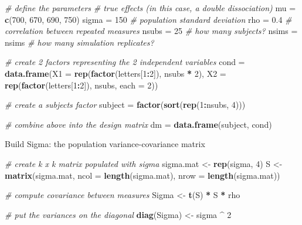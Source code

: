 \documentclass[
]{book}
\newenvironment{Shaded}{\begin{snugshade}}{\end{snugshade}}
\newcommand{\CommentTok}[1]{\textcolor[rgb]{0.56,0.35,0.01}{\textit{#1}}}
\newcommand{\DataTypeTok}[1]{\textcolor[rgb]{0.13,0.29,0.53}{#1}}
\newcommand{\DecValTok}[1]{\textcolor[rgb]{0.00,0.00,0.81}{#1}}
\newcommand{\FloatTok}[1]{\textcolor[rgb]{0.00,0.00,0.81}{#1}}
\newcommand{\KeywordTok}[1]{\textcolor[rgb]{0.13,0.29,0.53}{\textbf{#1}}}
\newcommand{\NormalTok}[1]{#1}
\newcommand{\OperatorTok}[1]{\textcolor[rgb]{0.81,0.36,0.00}{\textbf{#1}}}
\newcommand{\StringTok}[1]{\textcolor[rgb]{0.31,0.60,0.02}{#1}}
\begin{document}
\begin{Shaded}
\begin{Highlighting}[]
\CommentTok{# define the parameters}
\CommentTok{# true effects (in this case, a double dissociation)}
\NormalTok{mu =}\StringTok{ }\KeywordTok{c}\NormalTok{(}\DecValTok{700}\NormalTok{, }\DecValTok{670}\NormalTok{, }\DecValTok{690}\NormalTok{, }\DecValTok{750}\NormalTok{) }
\NormalTok{sigma =}\StringTok{ }\DecValTok{150}  \CommentTok{# population standard deviation}
\NormalTok{rho =}\StringTok{ }\FloatTok{0.4} \CommentTok{# correlation between repeated measures}
\NormalTok{nsubs =}\StringTok{ }\DecValTok{25} \CommentTok{# how many subjects?}
\NormalTok{nsims =}\StringTok{ }\NormalTok{nsims }\CommentTok{# how many simulation replicates?}
 
\CommentTok{# create 2 factors representing the 2 independent variables}
\NormalTok{cond =}\StringTok{ }\KeywordTok{data.frame}\NormalTok{(}\DataTypeTok{X1 =} \KeywordTok{rep}\NormalTok{(}\KeywordTok{factor}\NormalTok{(letters[}\DecValTok{1}\OperatorTok{:}\DecValTok{2}\NormalTok{]), nsubs }\OperatorTok{*}\StringTok{ }\DecValTok{2}\NormalTok{),}
\DataTypeTok{X2 =} \KeywordTok{rep}\NormalTok{(}\KeywordTok{factor}\NormalTok{(letters[}\DecValTok{1}\OperatorTok{:}\DecValTok{2}\NormalTok{]), nsubs, }\DataTypeTok{each =} \DecValTok{2}\NormalTok{))}
 
\CommentTok{# create a subjects factor}
\NormalTok{subject =}\StringTok{ }\KeywordTok{factor}\NormalTok{(}\KeywordTok{sort}\NormalTok{(}\KeywordTok{rep}\NormalTok{(}\DecValTok{1}\OperatorTok{:}\NormalTok{nsubs, }\DecValTok{4}\NormalTok{)))}
 
\CommentTok{# combine above into the design matrix}
\NormalTok{dm =}\StringTok{ }\KeywordTok{data.frame}\NormalTok{(subject, cond)}
\end{Highlighting}
\end{Shaded}

Build Sigma: the population variance-covariance matrix

\begin{Shaded}
\begin{Highlighting}[]
\CommentTok{# create k x k matrix populated with sigma}
\NormalTok{sigma.mat <-}\StringTok{ }\KeywordTok{rep}\NormalTok{(sigma, }\DecValTok{4}\NormalTok{)}
\NormalTok{S <-}
\KeywordTok{matrix}\NormalTok{(sigma.mat,}
\DataTypeTok{ncol =} \KeywordTok{length}\NormalTok{(sigma.mat),}
\DataTypeTok{nrow =} \KeywordTok{length}\NormalTok{(sigma.mat))}

\CommentTok{# compute covariance between measures}
\NormalTok{Sigma <-}\StringTok{ }\KeywordTok{t}\NormalTok{(S) }\OperatorTok{*}\StringTok{ }\NormalTok{S }\OperatorTok{*}\StringTok{ }\NormalTok{rho}

\CommentTok{# put the variances on the diagonal}
\KeywordTok{diag}\NormalTok{(Sigma) <-}\StringTok{ }\NormalTok{sigma }\OperatorTok{^}\StringTok{ }\DecValTok{2}  
\end{Highlighting}
\end{Shaded}
\end{document}

